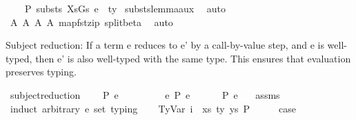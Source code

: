 \begin{isabellebody}
\ \ \ {\isachardoublequoteopen}{\isasymGamma}{}\ {\isasymturnstile}{\isacharbraceleft}{\kern0pt}P{\isacharbraceright}{\kern0pt}\ substs\ XsGs\ e{}\ {\isacharcolon}{\kern0pt}\ ty{}{\isachardoublequoteclose}\isanewline
%
\isadelimproof
%
\endisadelimproof
%
\isatagproof
{}\isamarkupfalse%
\ substs{\isacharunderscore}{\kern0pt}lemma{\isacharunderscore}{\kern0pt}aux\ \isamarkupfalse%
\ auto\isanewline
{}\isamarkupfalse%
\ A{}\ A{}\ A{}\ A{}\ map{\isacharunderscore}{\kern0pt}fst{\isacharunderscore}{\kern0pt}zip\ split{\isacharunderscore}{\kern0pt}beta\ \isamarkupfalse%
\ auto%
\endisatagproof
{\isafoldproof}%
%
\isadelimproof
%
\endisadelimproof
%
\begin{isamarkuptext}%
Subject reduction:
  If a term e reduces to e' by a call-by-value step,
  and e is well-typed,
  then e' is also well-typed with the same type.
  This ensures that evaluation preserves typing.%
\end{isamarkuptext}\isamarkuptrue%
\isamarkupfalse%
\ subject{\isacharunderscore}{\kern0pt}reduction{\isacharcolon}{\kern0pt}\isanewline
\ \ \ {\isachardoublequoteopen}{\isasymGamma}\ {\isasymturnstile}{\isacharbraceleft}{\kern0pt}P{\isacharbraceright}{\kern0pt}\ e\ {\isacharcolon}{\kern0pt}\ {\isasymtau}{\isachardoublequoteclose}\isanewline
\ \ \ \ \ \ \ {\isachardoublequoteopen}e\ {\isacharminus}{\kern0pt}{\isachargreater}{\kern0pt}{\isacharbraceleft}{\kern0pt}P{\isacharbraceright}{\kern0pt}\ e{\isacharprime}{\kern0pt}{\isachardoublequoteclose}\isanewline
\ \ \ \ \ {\isachardoublequoteopen}{\isasymGamma}\ {\isasymturnstile}{\isacharbraceleft}{\kern0pt}P{\isacharbraceright}{\kern0pt}\ e{\isacharprime}{\kern0pt}\ {\isacharcolon}{\kern0pt}\ {\isasymtau}{\isachardoublequoteclose}\isanewline
%
\isadelimproof
%
\endisadelimproof
%
\isatagproof
{}\isamarkupfalse%
\ assms\isanewline
{}\isamarkupfalse%
\ {\isacharparenleft}{\kern0pt}induct\ arbitrary{\isacharcolon}{\kern0pt}\ e{\isacharprime}{\kern0pt}\ set{\isacharcolon}{\kern0pt}\ typing{\isacharparenright}{\kern0pt}\isanewline
\ \ \isamarkupfalse%
\ {\isacharparenleft}{\kern0pt}TyVar\ i\ {\isasymGamma}\ xs\ ty\ ys\ P{\isacharparenright}{\kern0pt}\isanewline
\ \ \isamarkupfalse%
\ \isamarkupfalse%
\ {\isacharquery}{\kern0pt}case\isanewline

\end{isabellebody}
